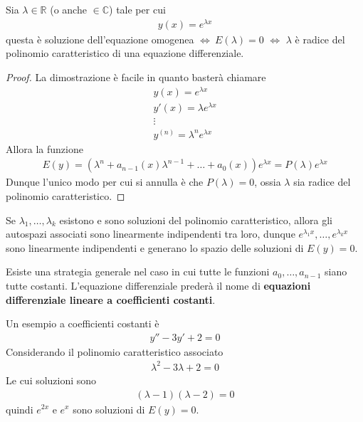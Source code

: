 \documentclass[a4paper, oneside]{book}
\begin{document}
\begin{theorem}
    Sia $\lambda \in \mathbb{R}$ (o anche $\in \mathbb{C}$) tale per cui
    \begin{gather*}
        y(x) = e^{\lambda x} 
    \end{gather*}
    questa è soluzione dell'equazione omogenea $\Longleftrightarrow \ E(\lambda) = 0$ $\Longleftrightarrow$ 
    $\lambda$ è radice del polinomio caratteristico di una equazione differenziale.
\end{theorem}
\begin{proof}
    La dimostrazione è facile in quanto basterà chiamare
    \begin{gather*}
        y(x) = e^{\lambda x} \\
        y'(x) = \lambda e^{\lambda x} \\
        \vdots \\
        y^{(n)} = \lambda^{n}e^{\lambda x}     
    \end{gather*}
    Allora la funzione
    \begin{gather*}
        E(y) = (\lambda^{n} + a_{n - 1}(x)\lambda^{n - 1} + \dots + a_0(x)  )e^{\lambda x} = P(\lambda)e^{\lambda x}   
    \end{gather*}
    Dunque l'unico modo per cui si annulla è che $P(\lambda) = 0$, ossia $\lambda$ sia radice del polinomio caratteristico.
\end{proof}
\begin{corollary}
    Se $\lambda_1, \dots, \lambda_k$ esistono e sono soluzioni del polinomio caratteristico,
    allora gli autospazi associati sono linearmente indipendenti tra loro, dunque 
    $e^{\lambda_1 x}, \dots, e^{\lambda_k x}$ sono linearmente indipendenti e
    generano lo spazio delle soluzioni di $E(y) = 0$. 
\end{corollary} 

\clearpage \noindent
    Esiste una strategia generale nel caso in cui tutte le funzioni
    $a_0,\dots, a_{n - 1}$ siano tutte costanti. L'equazione
    differenziale prederà il nome di \textbf{equazioni differenziale
    lineare a coefficienti costanti}. 
\begin{example}
    Un esempio a coefficienti costanti è
    \begin{gather*}
        y'' -3y' +2 = 0
    \end{gather*}
    Considerando il polinomio caratteristico associato
    \begin{gather*}
        \lambda^{2} - 3\lambda + 2 = 0 
    \end{gather*}
    Le cui soluzioni sono
    \begin{gather*}
        (\lambda - 1)(\lambda - 2) = 0 
    \end{gather*}
    quindi $e^{2x}$ e $e^{x}$ sono soluzioni di $E(y) = 0$.   
\end{example}
\end{document}
